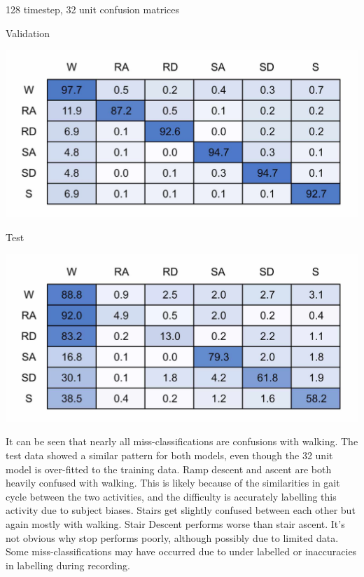 \documentclass[sensors,article,submit,moreauthors,pdftex]{Definitions/mdpi}
\begin{document}
\begin{table}[!hbt]
    \centering
    \caption{128 timestep, 32 unit confusion matrices}
    \label{tab:128x32_full_model_confusion_matrix}
    \begin{subtable}{.45\textwidth}
        \centering
        \caption{Validation}
        \label{tab:full_model_conf_matrix_training_128x32}
        \includegraphics[width=\textwidth]{Figures/results/conf_matricies/Training_128x32_NT.jpg}
    \end{subtable}
    \hfil
    \begin{subtable}{.45\textwidth}
        \centering
        \caption{Test}
        \label{tab:full_model_conf_matrix_test_128x32}
        \includegraphics[width=\textwidth]{Figures/results/conf_matricies/Test_128x32_NT.jpg}
    \end{subtable}
\end{table}

It can be seen that nearly all miss-classifications are confusions with walking. The test data showed a similar pattern for both models, even though the 32 unit model is over-fitted to the training data. Ramp descent and ascent are both heavily confused with walking. This is likely because of the similarities in gait cycle between the two activities, and the difficulty is accurately labelling this activity due to subject biases. Stairs get slightly confused between each other but again mostly with walking. Stair Descent performs worse than stair ascent. It's not obvious why stop performs poorly, although possibly due to limited data. Some miss-classifications may have occurred due to under labelled or inaccuracies in labelling during recording.
\end{document}
